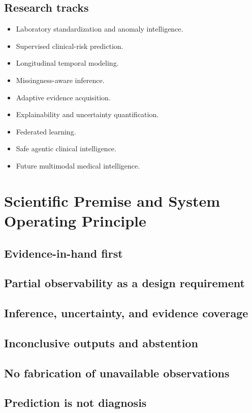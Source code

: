 \documentclass[11pt,journal,onecolumn,draftclsnofoot]{IEEEtran}
\begin{document}
\subsection{Research tracks}
\begin{itemize}
    \item Laboratory standardization and anomaly intelligence.
    \item Supervised clinical-risk prediction.
    \item Longitudinal temporal modeling.
    \item Missingness-aware inference.
    \item Adaptive evidence acquisition.
    \item Explainability and uncertainty quantification.
    \item Federated learning.
    \item Safe agentic clinical intelligence.
    \item Future multimodal medical intelligence.
\end{itemize}

\section{Scientific Premise and System Operating Principle}
\subsection{Evidence-in-hand first}
\subsection{Partial observability as a design requirement}
\subsection{Inference, uncertainty, and evidence coverage}
\subsection{Inconclusive outputs and abstention}
\subsection{No fabrication of unavailable observations}
\subsection{Prediction is not diagnosis}
\end{document}
